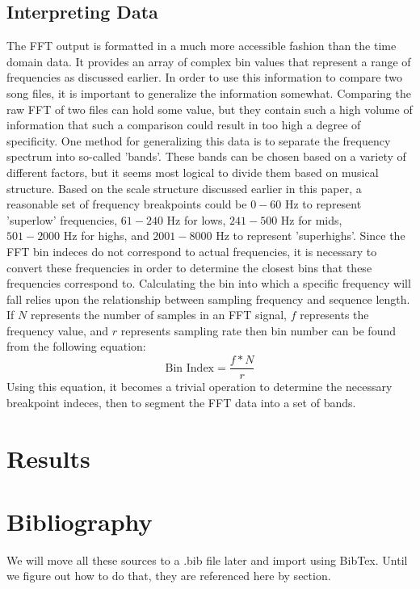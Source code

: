 \documentclass[conference]{IEEEtran}
\begin{document}
\subsection{Interpreting Data}
The FFT output is formatted in a much more accessible fashion than the time domain data. It provides an array of complex bin values that represent a range of frequencies as discussed earlier. In order to use this information to compare two song files, it is important to generalize the information somewhat. Comparing the raw FFT of two files can hold some value, but they contain such a high volume of information that such a comparison could result in too high a degree of specificity. One method for generalizing this data is to separate the frequency spectrum into so-called 'bands'. These bands can be chosen based on a variety of different factors, but it seems most logical to divide them based on musical structure. Based on the scale structure discussed earlier in this paper, a reasonable set of frequency breakpoints could be $0-60\text{ Hz}$ to represent 'superlow' frequencies, $61-240\text{ Hz}$ for lows, $241-500\text{ Hz}$ for mids, $501-2000\text{ Hz}$ for highs, and $2001-8000\text{ Hz}$ to represent 'superhighs'. Since the FFT bin indeces do not correspond to actual frequencies, it is necessary to convert these frequencies in order to determine the closest bins that these frequencies correspond to. Calculating the bin into which a specific frequency will fall relies upon the relationship between sampling frequency and sequence length. If $N$ represents the number of samples in an FFT signal, $f$ represents the frequency value, and $r$ represents sampling rate then bin number can be found from the following equation:
\begin{equation}\label{BinNum}
  \text{Bin Index}=\frac{f * N}{r}
\end{equation}
Using this equation, it becomes a trivial operation to determine the necessary breakpoint indeces, then to segment the FFT data into a set of bands. 


\section{Results}

\section{Bibliography}
We will move all these sources to a .bib file later and import using BibTex.
Until we figure out how to do that, they are referenced here by section.
\end{document}
